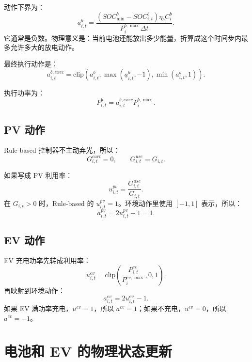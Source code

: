 \documentclass[UTF8,zihao=-4]{ctexart}
\begin{document}
动作下界为：
\begin{equation}
\underline a^b_{i,t}
=\frac{(SOC^b_{\min}-SOC^b_{i,t})\eta_b C^b_i}
{P^{b,\max}_i\Delta t}.
\end{equation}
它通常是负数。物理意义是：当前电池还能放出多少能量，折算成这个时间步内最多允许多大的放电动作。

最终执行动作是：
\begin{equation}
a^{b,exec}_{i,t}
=\mathrm{clip}
\left(
a^b_{i,t},
\max(\underline a^b_{i,t},-1),
\min(\overline a^b_{i,t},1)
\right).
\end{equation}

执行功率为：
\begin{equation}
P^b_{i,t}=a^{b,exec}_{i,t}P^{b,\max}_i.
\end{equation}

\subsection{PV 动作}

Rule-based 控制器不主动弃光，所以：
\begin{equation}
G^{curt}_{i,t}=0,\qquad G^{use}_{i,t}=G_{i,t}.
\end{equation}

如果写成 PV 利用率：
\begin{equation}
u^{pv}_{i,t}=\frac{G^{use}_{i,t}}{G_{i,t}}.
\end{equation}
在 $G_{i,t}>0$ 时，Rule-based 的 $u^{pv}_{i,t}=1$。环境动作里使用 $[-1,1]$ 表示，所以：
\begin{equation}
a^{pv}_{i,t}=2u^{pv}_{i,t}-1=1.
\end{equation}

\subsection{EV 动作}

EV 充电功率先转成利用率：
\begin{equation}
u^{ev}_{i,t}
=\mathrm{clip}\left(
\frac{P^{ev}_{i,t}}{P^{ev,\max}_i},0,1
\right).
\end{equation}
再映射到环境动作：
\begin{equation}
a^{ev}_{i,t}=2u^{ev}_{i,t}-1.
\end{equation}
如果 EV 满功率充电，$u^{ev}=1$，所以 $a^{ev}=1$；如果不充电，$u^{ev}=0$，所以 $a^{ev}=-1$。

\section{电池和 EV 的物理状态更新}
\end{document}
